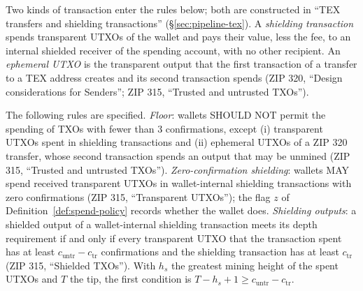 \documentclass[11pt,a4paper]{article}
\theoremstyle{definition}
\begin{document}
Two kinds of transaction enter the rules below; both are constructed in
``TEX transfers and shielding transactions'' (\S\ref{sec:pipeline-tex}).
A \emph{shielding transaction} spends transparent UTXOs of the wallet and pays
their value, less the fee, to an internal shielded receiver of the spending
account, with no other recipient. An \emph{ephemeral UTXO} is the
transparent output that the first transaction of a transfer to a TEX address
creates and its second transaction spends (ZIP 320, ``Design considerations
for Senders''; ZIP 315, ``Trusted and untrusted TXOs'').

The following rules are specified. \emph{Floor}: wallets SHOULD NOT permit
the spending of TXOs with fewer than $3$ confirmations, except (i)
transparent UTXOs spent in shielding transactions and (ii) ephemeral UTXOs
of a ZIP 320 transfer, whose second transaction spends an output that may be
unmined (ZIP 315, ``Trusted and untrusted TXOs''). \emph{Zero-confirmation
shielding}: wallets MAY spend received transparent UTXOs in wallet-internal
shielding transactions with zero confirmations (ZIP 315, ``Transparent
UTXOs''); the flag $z$ of Definition~\ref{def:spend-policy} records whether
the wallet does. \emph{Shielding outputs}: a shielded output of a
wallet-internal shielding transaction meets its depth requirement if and
only if every transparent UTXO that the transaction spent has at least
$c_{\mathrm{untr}} - c_{\mathrm{tr}}$ confirmations and the shielding
transaction has at least $c_{\mathrm{tr}}$ (ZIP 315, ``Shielded TXOs''). With
$h_s$ the greatest mining height of the spent UTXOs and $T$ the tip, the
first condition is $T - h_s + 1 \ge c_{\mathrm{untr}} - c_{\mathrm{tr}}$.
\end{document}

